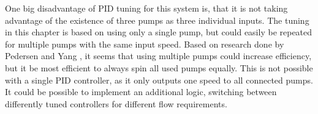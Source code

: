 One big disadvantage of PID tuning for this system is,
that it is not taking advantage of the existence of three pumps as three individual inputs.
The tuning in this chapter is based on using only a single pump,
but could easily be repeated for multiple pumps with the same input speed.
Based on research done by Pedersen and Yang \cite{YangMultiPump2008},
it seems that using multiple pumps could increase efficiency,
but it be most efficient to always spin all used pumps equally.
This is not possible with a single PID controller,
as it only outputs one speed to all connected pumps.
It could be possible to implement an additional logic,
switching between differently tuned controllers for different flow requirements.